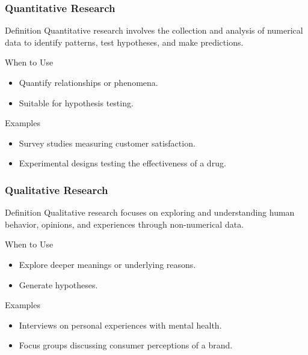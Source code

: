 \documentclass[aspectratio=169]{beamer}
\begin{document}
\begin{frame}[fragile]
    \frametitle{Quantitative Research}
    \begin{block}{Definition}
        Quantitative research involves the collection and analysis of numerical data to identify patterns, test hypotheses, and make predictions.
    \end{block}
    \begin{block}{When to Use}
        \begin{itemize}
            \item Quantify relationships or phenomena.
            \item Suitable for hypothesis testing.
        \end{itemize}
    \end{block}
    
    \begin{block}{Examples}
        \begin{itemize}
            \item Survey studies measuring customer satisfaction.
            \item Experimental designs testing the effectiveness of a drug.
        \end{itemize}
    \end{block}
\end{frame}

\begin{frame}[fragile]
    \frametitle{Qualitative Research}
    \begin{block}{Definition}
        Qualitative research focuses on exploring and understanding human behavior, opinions, and experiences through non-numerical data.
    \end{block}
    \begin{block}{When to Use}
        \begin{itemize}
            \item Explore deeper meanings or underlying reasons.
            \item Generate hypotheses.
        \end{itemize}
    \end{block}
    
    \begin{block}{Examples}
        \begin{itemize}
            \item Interviews on personal experiences with mental health.
            \item Focus groups discussing consumer perceptions of a brand.
        \end{itemize}
    \end{block}
\end{frame}
\end{document}
